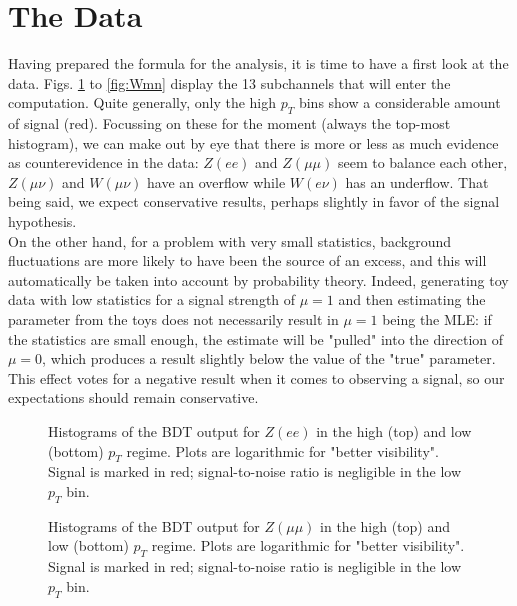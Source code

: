 \documentclass[aps,prb,twocolumn,showpacs,superscriptaddress,groupedaddress]{revtex4}  %
\begin{document}
\section{The Data}\label{sec:data}
Having prepared the formula for the analysis, it is time to have a first look at the data. Figs. \ref{fig:Zee} to \ref{fig:Wmn} display the 13 subchannels that will enter the computation. Quite generally, only the high $p_{T}$ bins show a considerable amount of signal (red). Focussing on these for the moment (always the top-most histogram), we can make out by eye that there is more or less as much evidence as counterevidence in the data: $Z(ee)$ and $Z(\mu\mu)$ seem to balance each other, $Z(\mu\nu)$ and $W(\mu\nu)$ have an overflow while $W(e\nu)$ has an underflow. That being said, we expect conservative results, perhaps slightly in favor of the signal hypothesis.\\
On the other hand, for a problem with very small statistics, background fluctuations are more likely to have been the source of an excess, and this will automatically be taken into account by probability theory. Indeed, generating toy data with low statistics for a signal strength of $\mu=1$ and then estimating the parameter from the toys does not necessarily result in $\mu=1$ being the MLE: if the statistics are small enough, the estimate will be "pulled" into the direction of $\mu=0$, which produces a result slightly below the value of the "true" parameter. This effect votes for a negative result when it comes to observing a signal, so our expectations should remain conservative.
\begin{figure}
\caption{\label{fig:Zee} Histograms of the BDT output for $Z(ee)$ in the high (top) and low (bottom) $p_{T}$ regime. Plots are logarithmic for "better visibility". Signal is marked in red; signal-to-noise ratio is negligible in the low $p_{T}$ bin.}
\end{figure}

\begin{figure}
\caption{\label{fig:Zmm} Histograms of the BDT output for $Z(\mu\mu)$ in the high (top) and low (bottom) $p_{T}$ regime. Plots are logarithmic for "better visibility". Signal is marked in red; signal-to-noise ratio is negligible in the low $p_{T}$ bin.}
\end{figure}
\end{document}
